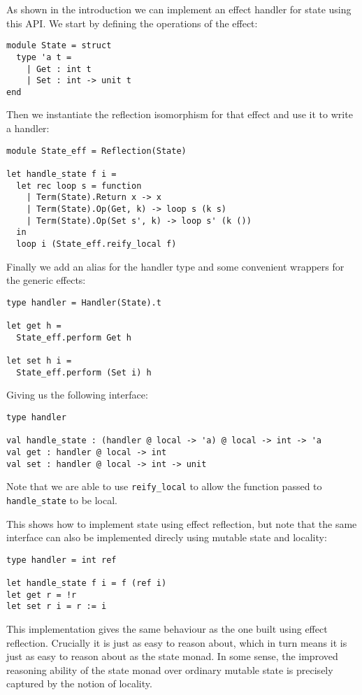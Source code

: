 \documentclass[acmsmall, screen, nonacm]{acmart}
\theoremstyle{definition}
\begin{document}
As shown in the introduction we can implement an effect handler for
state using this API. We start by defining the operations of the effect:
\begin{lstlisting}[style=oxcaml]
module State = struct
  type 'a t =
    | Get : int t
    | Set : int -> unit t
end
\end{lstlisting}
Then we instantiate the reflection isomorphism for that effect and use
it to write a handler:
\begin{lstlisting}[style=oxcaml]
module State_eff = Reflection(State)

let handle_state f i =
  let rec loop s = function
    | Term(State).Return x -> x
    | Term(State).Op(Get, k) -> loop s (k s)
    | Term(State).Op(Set s', k) -> loop s' (k ())
  in
  loop i (State_eff.reify_local f)
\end{lstlisting}
Finally we add an alias for the handler type and some convenient
wrappers for the generic effects:
\begin{lstlisting}[style=oxcaml]
type handler = Handler(State).t

let get h =
  State_eff.perform Get h

let set h i =
  State_eff.perform (Set i) h
\end{lstlisting}
Giving us the following interface:
\begin{lstlisting}[style=oxcaml]
type handler

val handle_state : (handler @ local -> 'a) @ local -> int -> 'a
val get : handler @ local -> int
val set : handler @ local -> int -> unit
\end{lstlisting}
Note that we are able to use \lstinline[style=oxcaml]{reify_local} to allow
the function passed to \lstinline[style=oxcaml]{handle_state} to be local.

This shows how to implement state using effect reflection, but note that
the same interface can also be implemented direcly using mutable state
and locality:
\begin{lstlisting}[style=oxcaml]
type handler = int ref

let handle_state f i = f (ref i)
let get r = !r
let set r i = r := i
\end{lstlisting}
This implementation gives the same behaviour as the one built using
effect reflection. Crucially it is just as easy to reason about, which
in turn means it is just as easy to reason about as the state monad. In
some sense, the improved reasoning ability of the state monad over
ordinary mutable state is precisely captured by the notion of locality.
\end{document}
